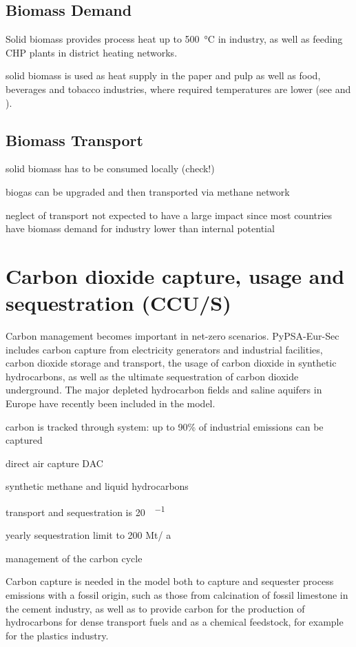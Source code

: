\subsection{Biomass Demand}

Solid biomass provides process heat up to \SI{500}{\celsius} in industry, as well as
feeding CHP plants in district heating networks.

solid biomass is used as heat supply in the paper and pulp as well as food, beverages and
tobacco industries, where required temperatures are lower (see
 and ).

\subsection{Biomass Transport}

solid biomass has to be consumed locally (check!)

biogas can be upgraded and then transported via methane network

neglect of transport not expected to have a large impact since most countries have biomass demand
for industry lower than internal potential


\section{Carbon dioxide capture, usage and sequestration (CCU/S)}

Carbon management becomes important in net-zero scenarios. PyPSA-Eur-Sec
includes carbon capture from electricity generators and industrial facilities,
carbon dioxide storage and transport, the usage of carbon dioxide in synthetic
hydrocarbons, as well as the ultimate sequestration of carbon dioxide
underground. The major depleted hydrocarbon fields and saline aquifers in Europe
have recently been included in the model.

carbon is tracked through system: up to 90\% of industrial emissions can be captured

direct air capture DAC

synthetic methane and liquid hydrocarbons

transport and sequestration is \SI{20}{\sieuro\per\tco}

yearly sequestration limit to 200 Mt\co / a

management of the carbon cycle

Carbon capture is needed in the model both to capture and sequester process
emissions with a fossil origin, such as those from calcination of fossil
limestone in the cement industry, as well as to provide carbon for the
production of hydrocarbons for dense transport fuels and as a chemical
feedstock, for example for the plastics industry.

